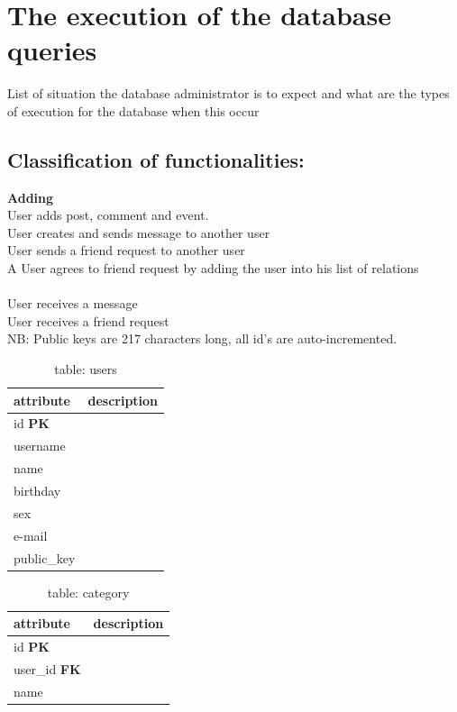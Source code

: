 \section{The execution of the database queries}
List of situation the database administrator is to expect and what are the types of execution for the database when this occur

\subsection{Classification of functionalities: }
\textbf{Adding}\\
User adds post, comment and event.\\
User creates and sends message to another user\\
User sends a friend request to another user \\
A User agrees to friend request by adding the user into his list of relations\\

\\
User receives a message\\
User receives a friend request\\


NB: Public keys are 217 characters long, all id's are auto-incremented.

\begin{table}[h]
    \centering
    \begin{tabular}{ll}
    attribute      & description\\ \hline
    id \textbf{PK} & \\
    username       & \\
    name           & \\
    birthday       & \\
    sex            & \\
    e-mail         & \\
    public\_key    & \\
    \end{tabular}
    \caption{table: users}
\end{table}

\begin{table}[h]
    \centering
    \begin{tabular}{ll}
    attribute            & description\\ \hline
    id \textbf{PK}       & \\
    user\_id \textbf{FK} & \\
    name                 & \\
    \end{tabular}
    \caption{table: category}
\end{table}

